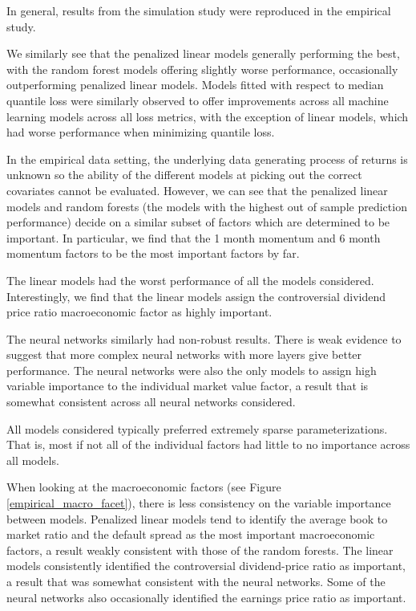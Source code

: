 \documentclass[a4paper, table]{article}
\begin{document}
In general, results from the simulation study were reproduced in the empirical study. 

We similarly see that the penalized linear models generally performing the best, with the random forest models offering slightly worse performance, occasionally outperforming penalized linear models. Models fitted with respect to median quantile loss were similarly observed to offer improvements across all machine learning models across all loss metrics, with the exception of linear models, which had worse performance when minimizing quantile loss.

In the empirical data setting, the underlying data generating process of returns is unknown so the ability of the different models at picking out the correct covariates cannot be evaluated. However, we can see that the penalized linear models and random forests (the models with the highest out of sample prediction performance) decide on a similar subset of factors which are determined to be important. In particular, we find that the 1 month momentum and 6 month momentum factors to be the most important factors by far. 

The linear models had the worst performance of all the models considered. Interestingly, we find that the linear models assign the controversial dividend price ratio macroeconomic factor as highly important. 

The neural networks similarly had non-robust results. There is weak evidence to suggest that more complex neural networks with more layers give better performance. The neural networks were also the only models to assign high variable importance to the individual market value factor, a result that is somewhat consistent across all neural networks considered. 

All models considered typically preferred extremely sparse parameterizations. That is, most if not all of the individual factors had little to no importance across all models. 

When looking at the macroeconomic factors (see Figure \ref{empirical_macro_facet}), there is less consistency on the variable importance between models. Penalized linear models tend to identify the average book to market ratio and the default spread as the most important macroeconomic factors, a result weakly consistent with those of the random forests. The linear models consistently identified the controversial dividend-price ratio as important, a result that was somewhat consistent with the neural networks. Some of the neural networks also occasionally identified the earnings price ratio as important.
\end{document}
